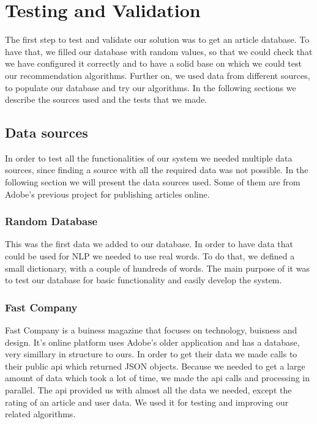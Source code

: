 \chapter{Testing and Validation}
\label{chapter:testing-validation}

The first step to test and validate our solution was to get an article database. To have that, we filled our database with random values, so that we could check that we have configured it correctly and to have a solid base on which we could test our recommendation algorithms.
Further on, we used data from different sources, to populate our database and try our algorithms.
In the following sections we describe the sources used and the tests that we made.

\section{Data sources} 
\label{sec:testing-and-validation-data-sources}
In order to test all the functionalities of our system we needed multiple data sources, since finding a source with all the required data was not possible.
In the following section we will present the data sources used. Some of them are from Adobe's previous project for publishing articles online.

\subsection{Random Database} 
\label{sec:testing-and-validation-data-sources-random-database}
This was the first data we added to our database.
In order to have data that could be used for NLP we needed to use real words. To do that, we defined a small dictionary, with a couple of hundreds of words.
The main purpose of it was to test our database for basic functionality and easily develop the system.

\subsection{Fast Company} 
\label{sec:testing-and-validation-data-sources-fast-company}
Fast Company is a buiness magazine that focuses on technology, buisness and design. It's online platform uses Adobe's older application and has a database, very simillary in structure to ours.
In order to get their data we made calls to their public api which returned JSON objects. Because we needed to get a large amount of data which took a lot of time, we made the api calls and processing in parallel. The api provided us with almost all the data we needed, except the rating of an article and user data. We used it for testing and improving our related algorithms.

